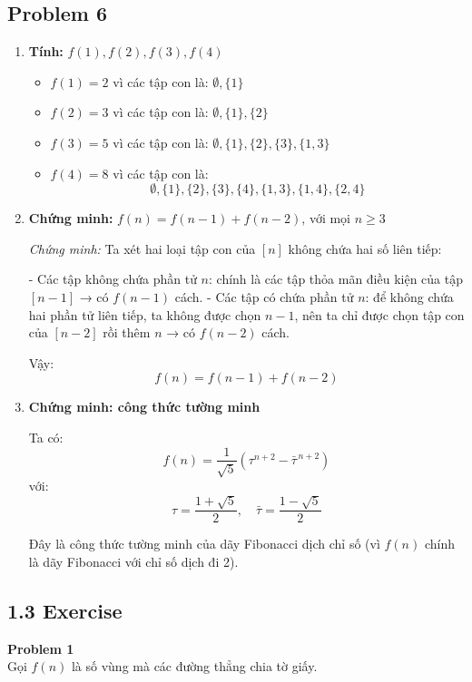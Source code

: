 \documentclass{article}
\begin{document}
	\subsection*{Problem 6}
	\begin{enumerate}[label=(\alph*)]
		\item \textbf{Tính:} \( f(1), f(2), f(3), f(4) \)
		
		\begin{itemize}
			\item \( f(1) = 2 \) vì các tập con là: \( \emptyset, \{1\} \)
			\item \( f(2) = 3 \) vì các tập con là: \( \emptyset, \{1\}, \{2\} \)
			\item \( f(3) = 5 \) vì các tập con là: \( \emptyset, \{1\}, \{2\}, \{3\}, \{1,3\} \)
			\item \( f(4) = 8 \) vì các tập con là: 
			\[
			\emptyset, \{1\}, \{2\}, \{3\}, \{4\}, \{1,3\}, \{1,4\}, \{2,4\}
			\]
		\end{itemize}
		
		\item \textbf{Chứng minh:} \( f(n) = f(n-1) + f(n-2) \), với mọi \( n \geq 3 \)
		
		\textit{Chứng minh:}  
		Ta xét hai loại tập con của \([n]\) không chứa hai số liên tiếp:
		
		- Các tập không chứa phần tử \(n\): chính là các tập thỏa mãn điều kiện của tập \([n-1]\) → có \(f(n-1)\) cách.
		- Các tập có chứa phần tử \(n\): để không chứa hai phần tử liên tiếp, ta không được chọn \(n-1\), nên ta chỉ được chọn tập con của \([n-2]\) rồi thêm \(n\) → có \(f(n-2)\) cách.
		
		Vậy:
		\[
		f(n) = f(n-1) + f(n-2)
		\]
		
		\item \textbf{Chứng minh: công thức tường minh}
		
		Ta có:
		\[
		f(n) = \frac{1}{\sqrt{5}} \left( \tau^{n+2} - \bar{\tau}^{\,n+2} \right)
		\]
		với:
		\[
		\tau = \frac{1 + \sqrt{5}}{2}, \quad \bar{\tau} = \frac{1 - \sqrt{5}}{2}
		\]
		
		Đây là công thức tường minh của dãy Fibonacci dịch chỉ số (vì \(f(n)\) chính là dãy Fibonacci với chỉ số dịch đi 2).
		
	\end{enumerate}
	
	\subsection*{1.3 Exercise}
	\textbf{Problem 1}\\
	Gọi \( f(n) \) là số vùng mà các đường thẳng chia tờ giấy.
	
\end{document}
